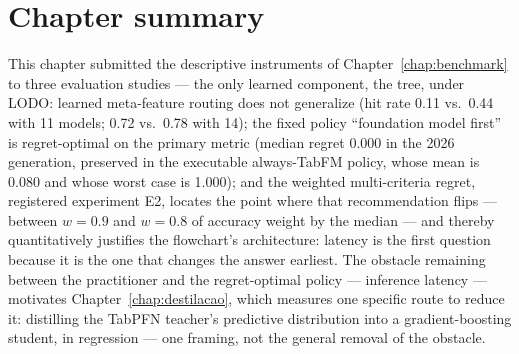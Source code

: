 \section{Chapter summary}

This chapter submitted the descriptive instruments of
Chapter~\ref{chap:benchmark} to three evaluation studies --- the
only learned component, the tree, under LODO: learned meta-feature
routing does not generalize (hit rate 0.11 vs.\ 0.44 with 11 models;
0.72 vs.\ 0.78 with 14); the fixed policy ``foundation model first''
is regret-optimal on the primary metric (median regret 0.000 in the
2026 generation, preserved in the executable always-TabFM policy,
whose mean is 0.080 and whose worst case is 1.000); and the weighted
multi-criteria regret, registered experiment E2, locates the point
where that recommendation flips --- between $w{=}0.9$ and $w{=}0.8$
of accuracy weight by the median --- and thereby quantitatively
justifies the flowchart's architecture: latency is the first
question because it is the one that changes the answer earliest. The
obstacle remaining between the practitioner and the regret-optimal
policy --- inference latency --- motivates
Chapter~\ref{chap:destilacao}, which measures one specific route to
reduce it: distilling the TabPFN teacher's predictive distribution
into a gradient-boosting student, in regression --- one framing, not
the general removal of the obstacle.
